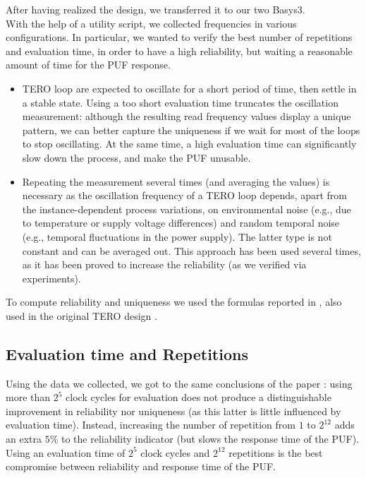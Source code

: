 After having realized the design, we transferred it to our two Basys3. \\
With the help of a utility script, we collected frequencies in various configurations. 
In particular, we wanted to verify the best number of repetitions and evaluation time,
in order to have a high reliability, but waiting a reasonable amount of
time for the PUF response. \\

\begin{itemize}
    \item TERO loop are expected to oscillate for a short period of time, then settle in a stable state.
    Using a too short evaluation time truncates the oscillation measurement: although the resulting read
    frequency values display a unique pattern, we can better capture the uniqueness  
    if we wait for most of the loops to stop oscillating. At the same time, a high evaluation time
    can significantly slow down the process, and make the PUF unusable.
    \item Repeating the measurement several times (and averaging the values) is necessary as the
    oscillation frequency of a TERO loop depends, apart from the instance-dependent process variations, on environmental
    noise (e.g., due to temperature or supply voltage differences) and random temporal noise 
    (e.g., temporal fluctuations in the power supply). The latter type is not constant and can be
    averaged out. This approach has been used several times, as it has been proved to increase the reliability
    (as we verified via experiments).
\end{itemize}  

\vspace{10pt}
To compute reliability and uniqueness we used the formulas reported in \cite{Journal}, also used in the
original TERO design \cite{tero_original}.

\subsection{Evaluation time and Repetitions}
\label{subsec:eval_and_repetitions}

Using the data we collected, we got to the same conclusions of the paper \cite{ref_pap}: using more than $ 2^5 $
clock cycles for evaluation does not produce a distinguishable improvement in reliability nor uniqueness 
(as this latter is little influenced by evaluation time). Instead, increasing the number of repetition
from $ 1 $ to $ 2^{12} $ adds an extra $ 5\% $ to the reliability indicator (but slows the response time of the PUF). \\
Using an evaluation time of $ 2^5 $ clock cycles and $ 2^{12} $ repetitions
is the best compromise between reliability and response time of the PUF. \\

